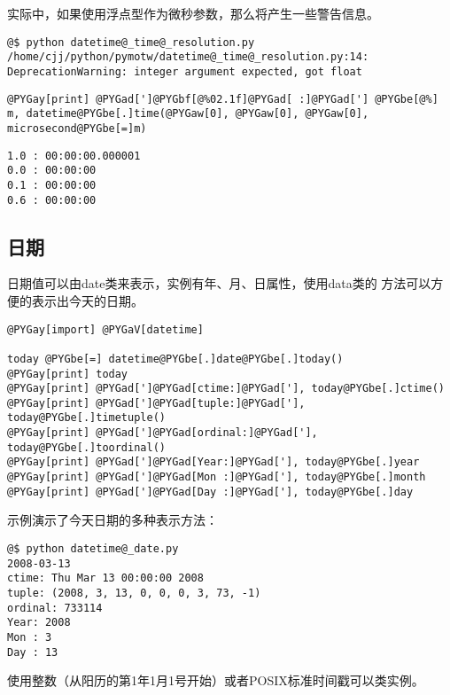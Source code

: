 \documentclass[a4paper,10pt,english]{manual}
\begin{document}
实际中，如果使用浮点型作为微秒参数，那么将产生一些警告信息。

\begin{Verbatim}[commandchars=@\[\]]
@$ python datetime@_time@_resolution.py
/home/cjj/python/pymotw/datetime@_time@_resolution.py:14: DeprecationWarning: integer argument expected, got float
\end{Verbatim}

\begin{Verbatim}[commandchars=@\[\]]
@PYGay[print] @PYGad[']@PYGbf[@%02.1f]@PYGad[ :]@PYGad['] @PYGbe[@%] m, datetime@PYGbe[.]time(@PYGaw[0], @PYGaw[0], @PYGaw[0], microsecond@PYGbe[=]m)
\end{Verbatim}

\begin{Verbatim}[commandchars=@\[\]]
1.0 : 00:00:00.000001
0.0 : 00:00:00
0.1 : 00:00:00
0.6 : 00:00:00
\end{Verbatim}


\subsection{日期}

日期值可以由date类来表示，实例有年、月、日属性，使用data类的  方法可以方便的表示出今天的日期。

\begin{Verbatim}[commandchars=@\[\]]
@PYGay[import] @PYGaV[datetime]

today @PYGbe[=] datetime@PYGbe[.]date@PYGbe[.]today()
@PYGay[print] today
@PYGay[print] @PYGad[']@PYGad[ctime:]@PYGad['], today@PYGbe[.]ctime()
@PYGay[print] @PYGad[']@PYGad[tuple:]@PYGad['], today@PYGbe[.]timetuple()
@PYGay[print] @PYGad[']@PYGad[ordinal:]@PYGad['], today@PYGbe[.]toordinal()
@PYGay[print] @PYGad[']@PYGad[Year:]@PYGad['], today@PYGbe[.]year
@PYGay[print] @PYGad[']@PYGad[Mon :]@PYGad['], today@PYGbe[.]month
@PYGay[print] @PYGad[']@PYGad[Day :]@PYGad['], today@PYGbe[.]day
\end{Verbatim}

示例演示了今天日期的多种表示方法：

\begin{Verbatim}[commandchars=@\[\]]
@$ python datetime@_date.py
2008-03-13
ctime: Thu Mar 13 00:00:00 2008
tuple: (2008, 3, 13, 0, 0, 0, 3, 73, -1)
ordinal: 733114
Year: 2008
Mon : 3
Day : 13
\end{Verbatim}

使用整数（从阳历的第1年1月1号开始）或者POSIX标准时间戳可以类实例。
\end{document}
